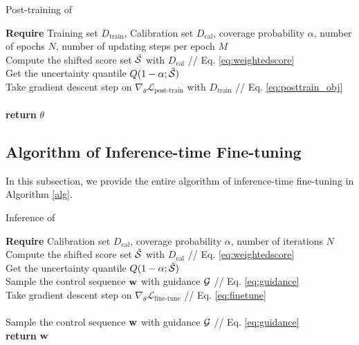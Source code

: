 \begin{algorithm}[b]
    \small
    \caption{Post-training of \proj}
    \label{algpost}
    \begin{algorithmic}[1]
    \STATE \textbf{Require} Training set $D_{\text{train}}$, Calibration set $D_{\text{cal}}$, coverage probability $\alpha$, number of epochs $N$, number of updating steps per epoch $M$ \\
        \STATE Compute the shifted score set $\Tilde{\S}$ with $D_{\text{cal}}$ \small{\color{gray}// Eq. \ref{eq:weightedscore}} \\
        \STATE Get the uncertainty quantile $Q(1-\alpha;\Tilde{\S})$ \\
            \STATE Take gradient descent step on $\nabla_{\theta}\mathcal{L}_{\text{post-train}}$ with $D_\textrm{train}$ \small{\color{gray}// Eq. \ref{eq:posttrain_obj}} 
        \ENDFOR
\hspace{0.8cm} \\
    \ENDFOR \\
    \STATE \textbf{return} $\theta$
    \end{algorithmic}
\end{algorithm}
    
\subsection{Algorithm of Inference-time Fine-tuning}
\label{app:alg}
In this subsection, we provide the entire algorithm of inference-time fine-tuning in Algorithm \ref{alg}.

\begin{algorithm}[ht]
    \small
    \caption{Inference of \proj}
    \label{alg}
    \begin{algorithmic}[1]
    \STATE \textbf{Require} Calibration set $D_{\text{cal}}$, coverage probability $\alpha$, number of iterations $N$ \\
        \STATE Compute the shifted score set $\Tilde{\S}$ with $D_{\text{cal}}$ \small{\color{gray}// Eq. \ref{eq:weightedscore}} \\
        \STATE Get the uncertainty quantile $Q(1-\alpha;\Tilde{\S})$ \\
        \STATE Sample the control sequence $\w$ with guidance $\G$ \small{\color{gray}// Eq. \ref{eq:guidance}} \\
        \STATE Take gradient descent step on $\nabla_{\theta}\mathcal{L}_{\text{fine-tune}}$ \small{\color{gray}// Eq. \ref{eq:finetune}} 
\hspace{0.8cm} \\
    \ENDFOR \\
    \STATE Sample the control sequence $\w$ with guidance $\G$ \small{\color{gray}// Eq. \ref{eq:guidance}} \\
    \STATE \textbf{return} $\w$
    \end{algorithmic}
\end{algorithm}




